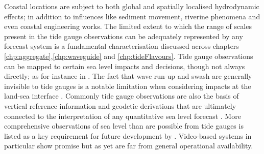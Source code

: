 Coastal locations are subject to both global and spatially localised hydrodynamic effects; in addition to influences like sediment movement, riverine phenomena and even coastal engineering works.  The limited extent to which the range of scales present in the tide gauge observations can be adequately represented by any forecast system is a fundamental characterisation discussed across chapters \ref{chp:aggregate},\ref{chp:waveguide} and \ref{chp:tideFlavours}.    
Tide gauge observations can be mapped to certain sea level impacts and decisions, though not always directly; as for instance in \citep{Hague:2019ha}.    The fact that wave run-up and swash are generally invisible to tide gauges is a notable limitation when considering impacts at the land-sea interface \citep{Serafin:2017fl,10.1007/s11069-020-04178-3}.
Commonly tide gauge observations are also the basis of vertical reference information and geodetic derivations that are ultimately connected to the interpretation of any quantitative sea level forecast \citep{Woppelmann:2006un,AVWS2021}.
More comprehensive observations of sea level than are possible from tide gauges is listed as a key requirement for future development by \citeauthor{10.3389/fmars.2019.00437}.    Video-based systems in particular show promise \citep{10.1175/jtech-d-18-0203.1,10.1002/2014gl060517} but as yet are far from general operational availability. 
